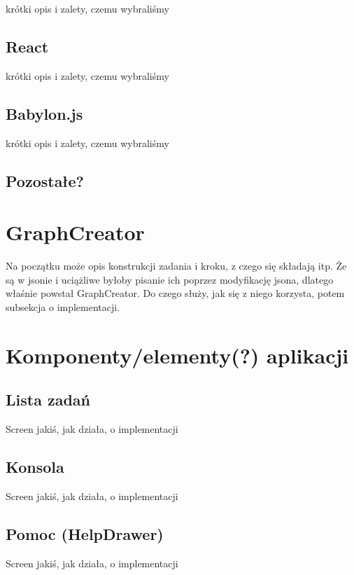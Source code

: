 \documentclass[11pt,a4paper,polish,thesis]{dcsbook}
\begin{document}
	krótki opis i zalety, czemu wybraliśmy
	
	\subsection{React}
	
	krótki opis i zalety, czemu wybraliśmy
	
	\subsection{Babylon.js}
	
	krótki opis i zalety, czemu wybraliśmy
	
	\subsection{Pozostałe?}
	
	\section{GraphCreator}
	Na początku może opis konstrukcji zadania i kroku, z czego się składają itp. 
	Że są w jsonie i uciążliwe byłoby pisanie ich poprzez modyfikację jsona, dlatego właśnie powstał GraphCreator.
	Do czego służy, jak się z niego korzysta, potem subsekcja o implementacji.
	
	\section{Komponenty/elementy(?) aplikacji}
	
	\subsection{Lista zadań}
	
	Screen jakiś, jak działa, o implementacji
	
	\subsection{Konsola}
	
	Screen jakiś, jak działa, o implementacji
	
	\subsection{Pomoc (HelpDrawer)}
	
	Screen jakiś, jak działa, o implementacji
	
\end{document}
